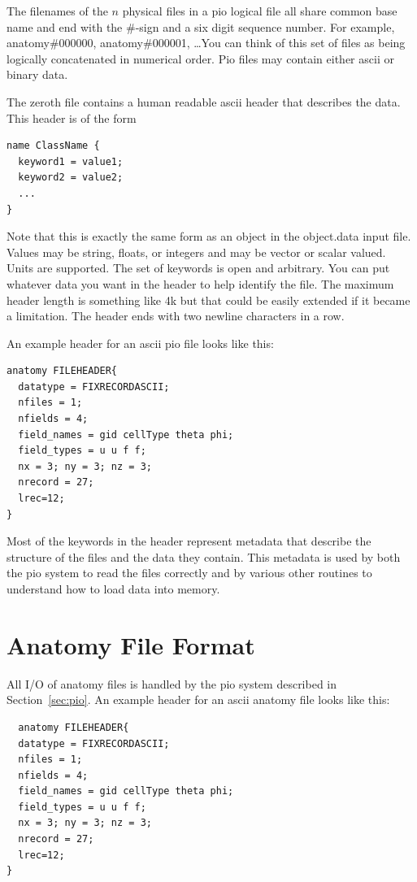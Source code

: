 \documentclass{article}
\begin{document}
The filenames of the $n$ physical files in a pio logical file all share
common base name and end with the \#-sign and a six digit sequence
number.  For example, anatomy\#000000, anatomy\#000001, \ldots You can
think of this set of files as being logically concatenated in numerical
order.  Pio files may contain either ascii or binary data.

The zeroth file contains a human readable ascii header that describes
the data.  This header is of the form
\begin{verbatim}
name ClassName { 
  keyword1 = value1; 
  keyword2 = value2;
  ...
}
\end{verbatim}
Note that this is exactly the same form as an object in the object.data
input file.  Values may be string, floats, or integers and may be vector
or scalar valued.  Units are supported.  The set of keywords is open and
arbitrary.  You can put whatever data you want in the header to help
identify the file.  The maximum header length is something like 4k but
that could be easily extended if it became a limitation.  The header
ends with two newline characters in a row.  

An example header for an ascii pio file looks like this:
\begin{verbatim}
anatomy FILEHEADER{
  datatype = FIXRECORDASCII;
  nfiles = 1;
  nfields = 4;
  field_names = gid cellType theta phi;
  field_types = u u f f;
  nx = 3; ny = 3; nz = 3;
  nrecord = 27;
  lrec=12;
}
\end{verbatim}

Most of the  keywords in the header represent metadata that describe the
structure of the files and the data they contain.  This metadata is used
by both the pio system to read the files correctly and by various other
routines to understand how to load data into memory.




\section{Anatomy File Format}
\label{sec:AnatomyFormat}

All I/O of anatomy files is handled by the pio system described in
Section~\ref{sec:pio}.  
An example header for an ascii anatomy file looks like this:
\begin{verbatim}
  anatomy FILEHEADER{
  datatype = FIXRECORDASCII;
  nfiles = 1;
  nfields = 4;
  field_names = gid cellType theta phi;
  field_types = u u f f;
  nx = 3; ny = 3; nz = 3;
  nrecord = 27;
  lrec=12;
}
\end{verbatim}
\end{document}
